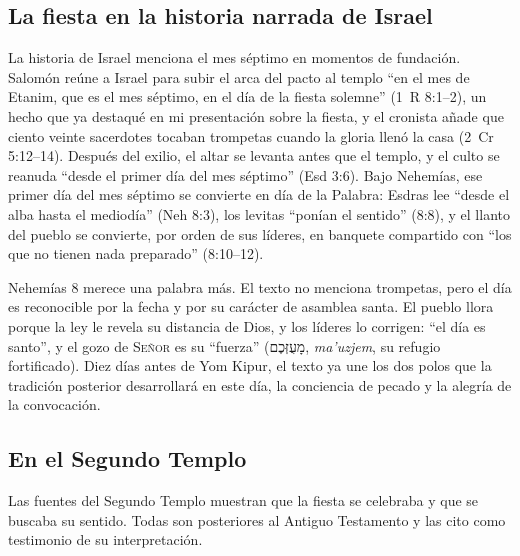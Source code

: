 \documentclass[11pt,letterpaper]{article}
\newcommand{\heb}[1]{\mbox{\foreignlanguage{hebrew}{#1}}}
\newcommand{\SENOR}{\textsc{Señor}}
\begin{document}
\subsection{La fiesta en la historia narrada de Israel}
La historia de Israel menciona el mes séptimo en momentos de fundación. Salomón reúne a Israel para subir el arca del pacto al templo ``en el mes de Etanim, que es el mes séptimo, en el día de la fiesta solemne'' (1~R 8:1--2), un hecho que ya destaqué en mi presentación sobre la fiesta, y el cronista añade que ciento veinte sacerdotes tocaban trompetas cuando la gloria llenó la casa (2~Cr 5:12--14). Después del exilio, el altar se levanta antes que el templo, y el culto se reanuda ``desde el primer día del mes séptimo'' (Esd 3:6). Bajo Nehemías, ese primer día del mes séptimo se convierte en día de la Palabra: Esdras lee ``desde el alba hasta el mediodía'' (Neh 8:3), los levitas ``ponían el sentido'' (8:8), y el llanto del pueblo se convierte, por orden de sus líderes, en banquete compartido con ``los que no tienen nada preparado'' (8:10--12).

Nehemías 8 merece una palabra más. El texto no menciona trompetas, pero el día es reconocible por la fecha y por su carácter de asamblea santa. El pueblo llora porque la ley le revela su distancia de Dios, y los líderes lo corrigen: ``el día es santo'', y el gozo de \SENOR{} es su ``fuerza'' (\heb{מָעֻזְּכֶם}, \emph{ma'uzjem}, su refugio fortificado). Diez días antes de Yom Kipur, el texto ya une los dos polos que la tradición posterior desarrollará en este día, la conciencia de pecado y la alegría de la convocación.

\subsection{En el Segundo Templo}
Las fuentes del Segundo Templo muestran que la fiesta se celebraba y que se buscaba su sentido. Todas son posteriores al Antiguo Testamento y las cito como testimonio de su interpretación.
\end{document}
